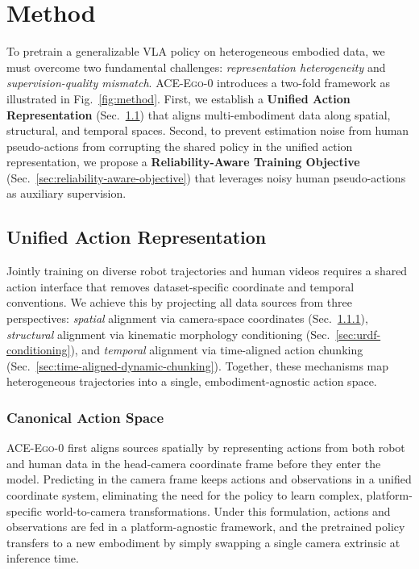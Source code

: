 \documentclass{llmxive}
\providecommand{\OURS}{\textsc{ACE-Ego-0}\xspace}
\providecommand{\Ours}{\OURS}
\begin{document}
\section{Method}
To pretrain a generalizable VLA policy on heterogeneous embodied data, we must overcome two fundamental challenges: \emph{representation heterogeneity} and \emph{supervision-quality mismatch}. \Ours introduces a two-fold framework as illustrated in Fig.~\ref{fig:method}. First, we establish a \textbf{Unified Action Representation} (Sec.~\ref{sec:unified-interface}) that aligns multi-embodiment data along spatial, structural, and temporal spaces. Second, to prevent estimation noise from human pseudo-actions from corrupting the shared policy in the unified action representation, we propose a \textbf{Reliability-Aware Training Objective} (Sec.~\ref{sec:reliability-aware-objective}) that leverages noisy human pseudo-actions as auxiliary supervision.

\subsection{Unified Action Representation}
\label{sec:unified-interface}

Jointly training on diverse robot trajectories and human videos requires a shared action interface that removes dataset-specific coordinate and temporal conventions. We achieve this by projecting all data sources from three perspectives: \emph{spatial} alignment via camera-space coordinates (Sec.~\ref{sec:camera-space-action}), \emph{structural} alignment via kinematic morphology conditioning (Sec.~\ref{sec:urdf-conditioning}), and \emph{temporal} alignment via time-aligned action chunking (Sec.~\ref{sec:time-aligned-dynamic-chunking}). Together, these mechanisms map heterogeneous trajectories into a single, embodiment-agnostic action space.

\subsubsection{Canonical Action Space}
\label{sec:camera-space-action}

\Ours first aligns sources spatially by representing actions from both robot and human data in the head-camera coordinate frame before they enter the model. Predicting in the camera frame keeps actions and observations in a unified coordinate system, eliminating the need for the policy to learn complex, platform-specific world-to-camera transformations. Under this formulation, actions and observations are fed in a platform-agnostic framework, and the pretrained policy transfers to a new embodiment by simply swapping a single camera extrinsic at inference time.
\end{document}
